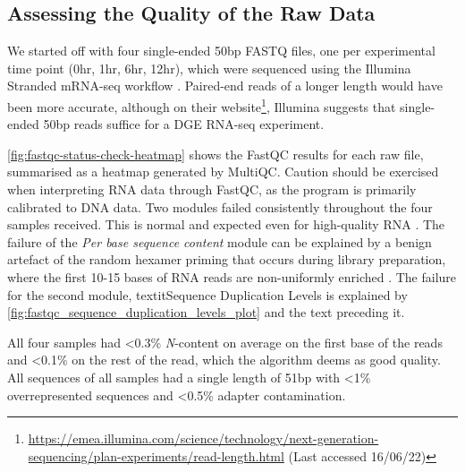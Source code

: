 \subsection{Assessing the Quality of the Raw Data}
\label{Assessing the Quality of the Raw Data}
We started off with four single-ended 50bp FASTQ files, one per experimental time point (0hr, 1hr, 6hr, 12hr), which were sequenced using the Illumina Stranded mRNA-seq workflow \citep{HiSeq2000}. Paired-end reads of a longer length would have been more accurate, although on their website\footnote{\url{https://emea.illumina.com/science/technology/next-generation-sequencing/plan-experiments/read-length.html} (Last accessed 16/06/22)}, Illumina suggests that single-ended 50bp reads suffice for a \ac{DGE} RNA-seq experiment.

\autoref{fig:fastqc-status-check-heatmap} shows the FastQC results for each raw file, summarised as a heatmap generated by MultiQC. Caution should be exercised when interpreting RNA data through FastQC, as the program is primarily calibrated to DNA data. Two modules failed consistently throughout the four samples received. This is normal and expected even for high-quality RNA \citep{hansen2010biases}. The failure of the \textit{Per base sequence content} module can be explained by a benign artefact of the random hexamer priming that occurs during library preparation, where the first 10-15 bases of RNA reads are non-uniformly enriched \citep{hansen2010biases}. The failure for the second module, textit{Sequence Duplication Levels} is explained by \autoref{fig:fastqc_sequence_duplication_levels_plot} and the text preceding it.

All four samples had <0.3\% \textit{N}-content on average on the first base of the reads and <0.1\% on the rest of the read, which the algorithm deems as good quality. All sequences of all samples had a single length of 51bp with <1\% overrepresented sequences and <0.5\% adapter contamination.






